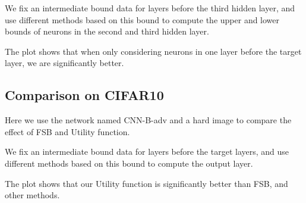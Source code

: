 We fix an intermediate bound data for layers before the third hidden layer, and use different methods based on this bound to compute the upper and lower bounds of neurons in the second and third hidden layer.

The plot shows that when only considering neurons in one layer before the target layer, we are significantly better.


\subsection*{Comparison on CIFAR10}

Here we use the network named CNN-B-adv and a hard image to compare the effect of FSB and Utility function. 

We fix an intermediate bound data for layers before the target layers, and use different methods based on this bound to compute the output layer.

The plot shows that our Utility function is significantly better than FSB, and other methods.
\fi
